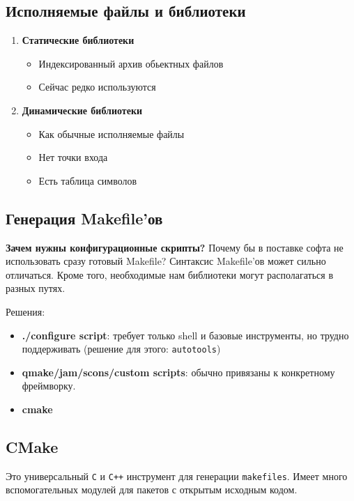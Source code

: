 \subsection{Исполняемые файлы и библиотеки}

\begin{enumerate}
	\item \textbf{Статические библиотеки}
		\begin{itemize}
			\item Индексированный архив обьектных файлов
			\item Сейчас редко используются
		\end{itemize}
	\item \textbf{Динамические библиотеки}
		\begin{itemize}
			\item Как обычные исполняемые файлы
			\item Нет точки входа
			\item Есть таблица символов
		\end{itemize}
\end{enumerate}


\subsection{Генерация Makefile'ов}

\textbf{Зачем нужны конфигурационные скрипты?} Почему бы в поставке софта не использовать сразу готовый Makefile? Синтаксис Makefile'ов может сильно отличаться. Кроме того, необходимые нам библиотеки могут располагаться в разных путях.

Решения:
\begin{itemize}
	\item \textbf{./configure script}: требует только shell и базовые инструменты, но трудно поддерживать (решение для этого: \texttt{autotools})
	\item \textbf{qmake/jam/scons/custom scripts}: обычно привязаны к конкретному фреймворку.
	\item \textbf{cmake}
\end{itemize}

\subsection{CMake}

Это универсальный \texttt{C} и \texttt{С++} инструмент для генерации \texttt{makefiles}. 
Имеет много вспомогательных модулей для пакетов с открытым исходным кодом. 

